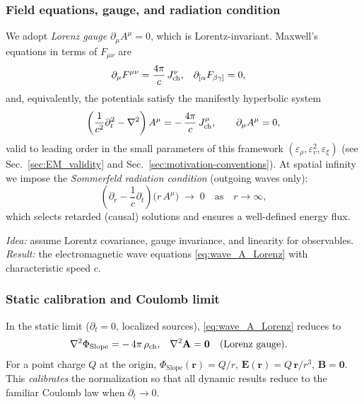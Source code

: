 \subsubsection{Field equations, gauge, and radiation condition}
We adopt \emph{Lorenz gauge} \(\partial_\mu A^\mu=0\), which is Lorentz-invariant.
Maxwell's equations in terms of \(F_{\mu\nu}\) are
\begin{align}
\partial_\mu F^{\mu\nu} &= \frac{4\pi}{c}\,J^\nu_{\rm ch}, &
\partial_{[\alpha}F_{\beta\gamma]} &= 0,
\end{align}
and, equivalently, the potentials satisfy the manifestly hyperbolic system
\begin{equation}
\left(\frac{1}{c^2}\partial_t^2-\nabla^2\right) A^\mu
= -\,\frac{4\pi}{c}\,J^\mu_{\rm ch}, \qquad \partial_\mu A^\mu=0,
\label{eq:wave_A_Lorenz}
\end{equation}
valid to leading order in the small parameters of this framework
\((\varepsilon_\rho,\varepsilon_v^2,\varepsilon_\xi)\) (see Sec.~\ref{sec:EM_validity} and Sec.~\ref{sec:motivation-conventions}).
At spatial infinity we impose the \emph{Sommerfeld radiation condition} (outgoing waves only):
\begin{equation}
\left(\partial_r - \frac{1}{c}\partial_t\right)\!\big(r\,A^\mu\big) \;\to\; 0
\quad \text{as}\quad r\to\infty,
\end{equation}
which selects retarded (causal) solutions and ensures a well-defined energy flux.

\noindent\emph{Idea:} assume Lorentz covariance, gauge invariance, and linearity for observables. \;
\emph{Result:} the electromagnetic wave equations \eqref{eq:wave_A_Lorenz} with characteristic speed \(c\).

\subsubsection{Static calibration and Coulomb limit}
In the static limit (\(\partial_t=0\), localized sources), \eqref{eq:wave_A_Lorenz} reduces to
\begin{align}
\nabla^2 \Phi_{\text{Slope}} &= -\,4\pi\,\rho_{\rm ch}, &
\nabla^2 \mathbf A &= \mathbf 0 \quad (\text{Lorenz gauge}).
\end{align}
For a point charge \(Q\) at the origin,
\(\Phi_{\text{Slope}}(\mathbf r)= Q/r\), \(\mathbf E(\mathbf r)= Q\,\mathbf r/r^3\), \(\mathbf B=\mathbf 0\).
This \emph{calibrates} the normalization so that all dynamic results reduce to the familiar Coulomb law when \(\partial_t\to0\).

